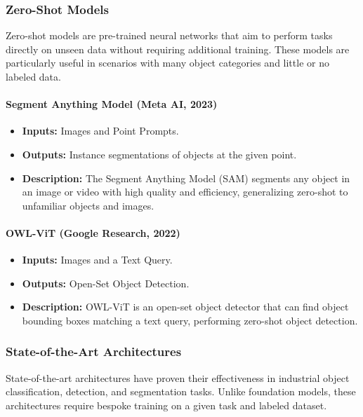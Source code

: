 \documentclass[12pt]{article}
\begin{document}
\subsubsection{Zero-Shot Models}

Zero-shot models are pre-trained neural networks that aim to perform tasks directly on unseen data without requiring additional training. These models are particularly useful in scenarios with many object categories and little or no labeled data.

\paragraph{Segment Anything Model (Meta AI, 2023)}

\begin{itemize}
    \item \textbf{Inputs:} Images and Point Prompts.
    \item \textbf{Outputs:} Instance segmentations of objects at the given point.
    \item \textbf{Description:} The Segment Anything Model (SAM) segments any object in an image or video with high quality and efficiency, generalizing zero-shot to unfamiliar objects and images.
\end{itemize}

\paragraph{OWL-ViT (Google Research, 2022)}

\begin{itemize}
    \item \textbf{Inputs:} Images and a Text Query.
    \item \textbf{Outputs:} Open-Set Object Detection.
    \item \textbf{Description:} OWL-ViT is an open-set object detector that can find object bounding boxes matching a text query, performing zero-shot object detection.
\end{itemize}

\subsubsection{State-of-the-Art Architectures}

State-of-the-art architectures have proven their effectiveness in industrial object classification, detection, and segmentation tasks. Unlike foundation models, these architectures require bespoke training on a given task and labeled dataset.
\end{document}
